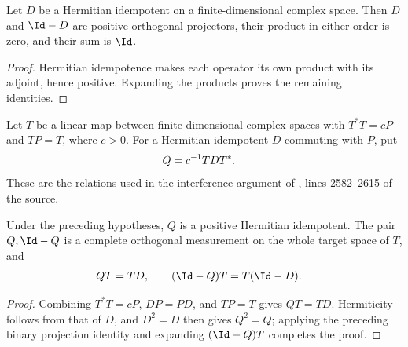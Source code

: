\begin{lemma}
    \label{thm:peps_binary_projection_family}
    \leanok
    Let $D$ be a Hermitian idempotent on a finite-dimensional complex space.
    Then $D$ and $\Id-D$ are positive orthogonal projectors, their product in
    either order is zero, and their sum is $\Id$.
\end{lemma}

\begin{proof}\leanok
    Hermitian idempotence makes each operator its own product with its
    adjoint, hence positive. Expanding the products proves the remaining
    identities.
\end{proof}

\begin{definition}
    \label{def:peps_scaled_projection_transport}
    \leanok
    Let $T$ be a linear map between finite-dimensional complex spaces with
    $T^*T=cP$ and $TP=T$, where $c>0$. For a Hermitian idempotent $D$
    commuting with $P$, put
    \begin{align}
        Q & =c^{-1}TDT^*.\notag
    \end{align}
    These are the relations used in the interference argument of
    \cite[Section~6]{Schuch2010PEPS}, lines 2582--2615 of the source.
\end{definition}

\begin{lemma}
    \label{thm:peps_scaled_projection_transport}
    \leanok
    Under the preceding hypotheses, $Q$ is a positive Hermitian idempotent.
    The pair $Q,\Id-Q$ is a complete orthogonal measurement on the whole
    target space of $T$, and
    \begin{align}
        QT & =TD,\qquad (\Id-Q)T=T(\Id-D).\notag
    \end{align}
\end{lemma}

\begin{proof}\leanok
    Combining $T^*T=cP$, $DP=PD$, and $TP=T$ gives $QT=TD$.
    Hermiticity follows from that of $D$, and $D^2=D$ then gives $Q^2=Q$;
    applying the preceding binary projection identity and expanding $(\Id-Q)T$
    completes the proof.
\end{proof}

